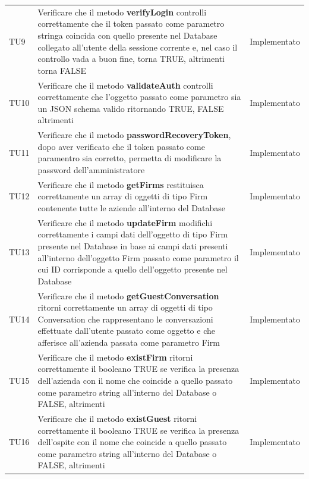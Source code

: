 \documentclass[../PianoDiQualifica_v4.0.0.tex]{subfiles}
\begin{document}
\begin{longtable}[c] { >{\centering\arraybackslash}p{2cm} p{9cm} >{\centering\arraybackslash}p{4cm}}
			\addlinespace[0.3em]
			\midrule
			\addlinespace[0.3em]
			TU9 & Verificare che il metodo \textbf{verifyLogin} controlli correttamente che il token passato come parametro stringa coincida con quello presente nel Database collegato all'utente della sessione corrente e, nel caso il controllo vada a buon fine, torna TRUE, altrimenti torna FALSE & Implementato \\
			\addlinespace[0.3em]
			\midrule
			\addlinespace[0.3em]
			TU10 & Verificare che il metodo \textbf{validateAuth} controlli correttamente che l'oggetto passato come parametro sia un JSON schema valido ritornando TRUE, FALSE altrimenti & Implementato \\
			\addlinespace[0.3em]
			\midrule
			\addlinespace[0.3em]
			TU11 & Verificare che il metodo \textbf{passwordRecoveryToken}, dopo aver verificato che il token passato come paramentro sia corretto, permetta di modificare la password dell'amministratore &Implementato \\
			\addlinespace[0.3em]
			\midrule
			\addlinespace[0.3em]
			TU12 & Verificare che il metodo \textbf{getFirms} restituisca correttamente un array di oggetti di tipo Firm contenente tutte le aziende all'interno del Database & Implementato \\
			\addlinespace[0.3em]
			\midrule
			\addlinespace[0.3em]
			TU13 & Verificare che il metodo \textbf{updateFirm} modifichi correttamente i campi dati dell'oggetto di tipo Firm presente nel Database in base ai campi dati presenti all'interno dell'oggetto Firm passato come parametro il cui ID corrisponde a quello dell'oggetto presente nel Database & Implementato \\
			\addlinespace[0.3em]
			\midrule
			\addlinespace[0.3em]
			TU14 & Verificare che il metodo \textbf{getGuestConversation} ritorni correttamente un array di oggetti di tipo Conversation che rappresentano le conversazioni effettuate dall'utente passato come oggetto e che afferisce all'azienda passata come parametro Firm & Implementato \\
			\addlinespace[0.3em]
			\midrule
			\addlinespace[0.3em]
			TU15 & Verificare che il metodo \textbf{existFirm} ritorni correttamente il booleano TRUE se verifica la presenza dell'azienda con il nome che coincide a quello passato come parametro string all'interno del Database o FALSE, altrimenti & Implementato \\
			\addlinespace[0.3em]
			\midrule
			\addlinespace[0.3em]
			TU16 & Verificare che il metodo \textbf{existGuest} ritorni correttamente il booleano TRUE se verifica la presenza dell'ospite con il nome che coincide a quello passato come parametro string all'interno del Database o FALSE, altrimenti & Implementato \\

\end{longtable}
\end{document}
